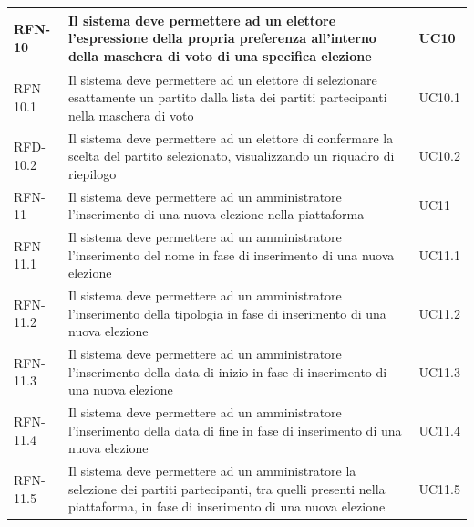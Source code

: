 \begin{longtable}{| p{} | p{} | p{} |}
\hline

RFN-10     & Il sistema deve permettere ad un elettore l'espressione della propria preferenza all'interno della maschera di voto di una specifica elezione  & UC10 \\

\hline

RFN-10.1     & Il sistema deve permettere ad un elettore di selezionare esattamente un partito dalla lista dei partiti partecipanti nella maschera di voto  & UC10.1 \\

\hline

RFD-10.2     & Il sistema deve permettere ad un elettore di confermare la scelta del partito selezionato, visualizzando un riquadro di riepilogo  & UC10.2 \\

\hline

RFN-11     & Il sistema deve permettere ad un amministratore l'inserimento di una nuova elezione nella piattaforma  & UC11 \\

\hline

RFN-11.1     & Il sistema deve permettere ad un amministratore l'inserimento del nome in fase di inserimento di una nuova elezione  & UC11.1 \\

\hline

RFN-11.2     & Il sistema deve permettere ad un amministratore l'inserimento della tipologia in fase di inserimento di una nuova elezione  & UC11.2 \\

\hline

RFN-11.3     & Il sistema deve permettere ad un amministratore l'inserimento della data di inizio in fase di inserimento di una nuova elezione  & UC11.3 \\

\hline

RFN-11.4     & Il sistema deve permettere ad un amministratore l'inserimento della data di fine in fase di inserimento di una nuova elezione  & UC11.4 \\

\hline

RFN-11.5     & Il sistema deve permettere ad un amministratore la selezione dei partiti partecipanti, tra quelli presenti nella piattaforma, in fase di inserimento di una nuova elezione  & UC11.5 \\

\hline


\end{longtable}
